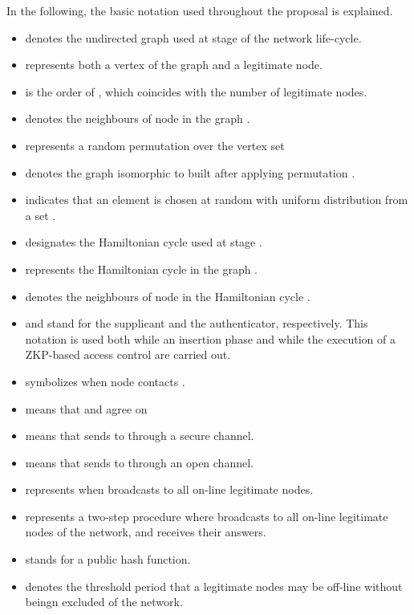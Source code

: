 \documentclass{article}
\begin{document}
In the following, the basic notation used throughout the proposal is explained.

\begin{itemize}
\item  denotes the undirected graph used at stage  of the network
life-cycle.

\item   represents both a vertex of the graph and a legitimate node.

\item  is the order of , which coincides with the
number of legitimate nodes.

\item  denotes the neighbours of node  in the graph .

\item  represents a random permutation over the
vertex set 

\item  denotes the graph isomorphic to  built after applying permutation .

\item  indicates that an element  is chosen at random with uniform distribution from a set .

\item  designates the Hamiltonian cycle used at stage .

\item  represents the Hamiltonian cycle  in the graph
.

\item  denotes the neighbours of node  in the Hamiltonian
cycle .

\item  and  stand for the supplicant and the
authenticator, respectively. This notation is used both while an insertion phase and while the
execution of a ZKP-based access control are carried out.

\item  symbolizes when node  contacts .

\item   means that  and  agree on 

\item   means that  sends 
to  through a secure channel.

\item   means that  sends 
to  through an open channel.

\item  represents when  broadcasts  to all on-line legitimate nodes.

\item  represents a two-step procedure where 
broadcasts  to all on-line legitimate nodes of the
network, and receives their answers.

\item  stands for a public hash function.

\item  denotes the
threshold period that a legitimate nodes may be off-line without beingn excluded of the network.

\end{itemize}
\end{document}
